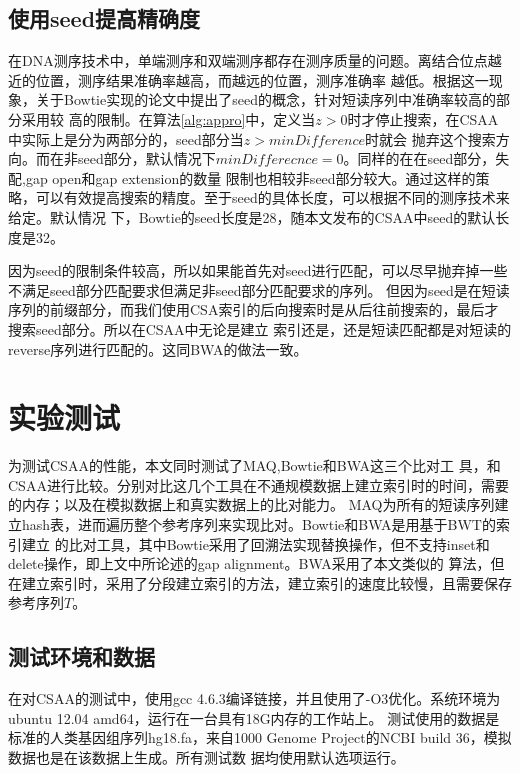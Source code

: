 \subsection{使用seed提高精确度}
在DNA测序技术中，单端测序和双端测序都存在测序质量的问题。离结合位点越近的位置，测序结果准确率越高，而越远的位置，测序准确率
越低。根据这一现象，关于Bowtie实现的论文\cite{langmead2009ultrafast}中提出了seed的概念，针对短读序列中准确率较高的部分采用较
高的限制。在算法\ref{alg:appro}中，定义当$z>0$时才停止搜索，在CSAA中实际上是分为两部分的，seed部分当$z>minDifference$时就会
抛弃这个搜索方向。而在非seed部分，默认情况下$minDifferecnce=0$。同样的在在seed部分，失配,gap open和gap extension的数量
限制也相较非seed部分较大。通过这样的策略，可以有效提高搜索的精度。至于seed的具体长度，可以根据不同的测序技术来给定。默认情况
下，Bowtie的seed长度是28，随本文发布的CSAA中seed的默认长度是32。

因为seed的限制条件较高，所以如果能首先对seed进行匹配，可以尽早抛弃掉一些不满足seed部分匹配要求但满足非seed部分匹配要求的序列。
但因为seed是在短读序列的前缀部分，而我们使用CSA索引的后向搜索时是从后往前搜索的，最后才搜索seed部分。所以在CSAA中无论是建立
索引还是，还是短读匹配都是对短读的reverse序列进行匹配的。这同BWA的做法一致。

\section{实验测试}

为测试CSAA的性能，本文同时测试了MAQ\cite{li2008mapping},Bowtie\cite{langmead2009ultrafast}和BWA\cite{li2009fast}这三个比对工
具，和CSAA进行比较。分别对比这几个工具在不通规模数据上建立索引时的时间，需要的内存；以及在模拟数据上和真实数据上的比对能力。
MAQ为所有的短读序列建立hash表，进而遍历整个参考序列来实现比对。Bowtie和BWA是用基于BWT的索引建立
的比对工具，其中Bowtie采用了回溯法实现替换操作，但不支持inset和delete操作，即上文中所论述的gap alignment。BWA采用了本文类似的
算法，但在建立索引时，采用了分段建立索引的方法，建立索引的速度比较慢，且需要保存参考序列$T$。

\subsection{测试环境和数据}
在对CSAA的测试中，使用gcc 4.6.3编译链接，并且使用了-O3优化。系统环境为ubuntu 12.04 amd64，运行在一台具有18G内存的工作站上。
测试使用的数据是标准的人类基因组序列hg18.fa，来自1000 Genome Project的NCBI build 36，模拟数据也是在该数据上生成。所有测试数
据均使用默认选项运行。

